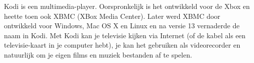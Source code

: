 Kodi is een multimedia-player. Oorspronkelijk is het ontwikkeld voor de Xbox en heette toen ook XBMC (XBox Media Center). Later werd XBMC door ontwikkeld voor Windows, Mac OS X en Linux en na versie 13 vernaderde de naam in Kodi. Met Kodi kan je televisie kijken via Internet (of de kabel als een televisie-kaart in je computer hebt), je kan het gebruiken als videorecorder en natuurlijk om je eigen films en muziek bestanden af te spelen.

